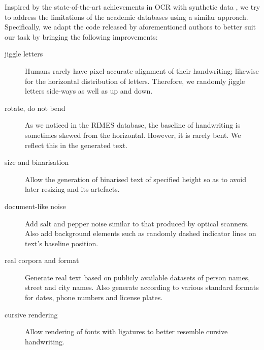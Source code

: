 			Inspired by the state-of-the-art achievements in OCR with synthetic data \citep{synthetic_data}, we try to address the limitations of the academic databases using a similar approach. Specifically, we adapt the code released by aforementioned authors to better suit our task by bringing the following improvements:
			\begin{description}
				\item[jiggle letters] Humans rarely have pixel-accurate alignment of their handwriting; likewise for the horizontal distribution of letters. Therefore, we randomly jiggle letters side-ways as well as up and down.

				\item[rotate, do not bend] As we noticed in the RIMES database, the baseline of handwriting is sometimes skewed from the horizontal. However, it is rarely bent. We reflect this in the generated text.

				\item[size and binarisation] Allow the generation of binarised text of specified height so as to avoid later resizing and its artefacts.

				\item[document-like noise] Add salt and pepper noise similar to that produced by optical scanners. Also add background elements such as randomly dashed indicator lines on text's baseline position.

				\item[real corpora and format] Generate real text based on publicly available datasets of person names, street and city names. Also generate according to various standard formats for dates, phone numbers and license plates.

				\item[cursive rendering] Allow rendering of fonts with ligatures to better resemble cursive handwriting.
			\end{description}

